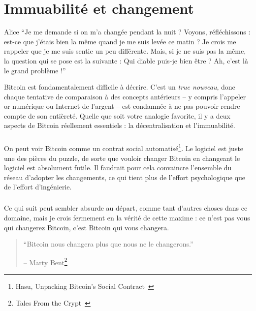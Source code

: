 \chapter{Immuabilité et changement}
\label{les:1}

\begin{chapquote}{Alice}
\enquote{Je me demande si on m’a changée pendant la nuit ? Voyons,
réfléchissons : est-ce que j’étais bien la même quand je me suis levée ce
matin ? Je crois me rappeler que je me suis sentie un peu différente. Mais, si
je ne suis pas la même, la question qui se pose est la suivante : Qui diable
puis-je bien être ? Ah, c’est là le grand problème !}
\end{chapquote}

Bitcoin est fondamentalement difficile à décrire. C'est un \textit{truc
nouveau}, donc chaque tentative de comparaison à des concepts antérieurs -- y
compris l'appeler or numérique ou Internet de l'argent -- est condamnée à ne pas
pouvoir rendre compte de son entièreté. Quelle que soit votre analogie favorite,
il y a deux aspects de Bitcoin réellement essentiels : la décentralisation et
l'immuabilité.

\paragraph{}
On peut voir Bitcoin comme un contrat social automatisé\footnote{Hasu, Unpacking
Bitcoin's Social Contract~\cite{social-contract}}. Le logiciel est juste une des
pièces du puzzle, de sorte que vouloir changer Bitcoin en changeant le logiciel
est absolument futile. Il faudrait pour cela convaincre l'ensemble du réseau
d'adopter les changements, ce qui tient plus de l'effort psychologique que de
l'effort d'ingénierie.

\paragraph{}
Ce qui suit peut sembler absurde au départ, comme tant d'autres choses dans ce
domaine, mais je crois fermement en la vérité de cette maxime : ce n'est pas
vous qui changerez Bitcoin, c'est Bitcoin qui vous changera.

\begin{quotation}\begin{samepage}
\enquote{Bitcoin nous changera plus que nous ne le changerons.}
\begin{flushright} -- Marty Bent\footnote{Tales From the Crypt~\cite{tftc21}}
\end{flushright}\end{samepage}\end{quotation}

